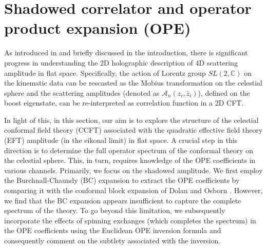 \section{Shadowed correlator and operator product expansion (OPE)}\label{ch5:sec4}
As introduced in \cite{Pasterski:2016qvg, Strominger:2017zoo} and briefly discussed in the introduction, there is significant progress in understanding the 2D holographic description of 4D scattering amplitude in flat space. Specifically, the action of Lorentz group $SL(2,\mathbb{C})$ on the kinematic data can be rescasted as the Mobius transformation on the celestial sphere and the scattering amplitudes (denoted as $\mathcal{A}_{n}(z_i,\bar z_i)$), defined on the boost eigenstate, can be re-interpreted as correlation function in a 2D CFT.\par
In light of this, in this section, our aim is to explore the structure of the celestial conformal field theory (CCFT) associated with the quadratic effective field theory (EFT) amplitude (in the eikonal limit) in flat space. A crucial step in this direction is to determine the full operator spectrum of the conformal theory on the celestial sphere. This, in turn, requires knowledge of the OPE coefficients in various channels. Primarily, we focus on the shadowed amplitude. We first employ the Burchnall-Chaundy (BC) expansion to extract the OPE coefficients by comparing it with the conformal block expansion of Dolan and Osborn \cite{Dolan:2003hv}. However, we find that the BC expansion appears insufficient to capture the complete spectrum of the theory. To go beyond this limitation, we subsequently incorporate the effects of spinning exchanges (which completes the spectrum) in the OPE coefficients using the Euclidean OPE inversion formula \cite{Caron-Huot:2017vep, Simmons-Duffin:2017nub, Mazac:2018qmi, Mukhametzhanov:2018zja} and consequently comment on the subtlety associated with the inversion.

